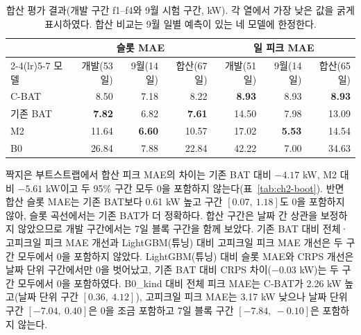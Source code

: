 \begin{table}[htbp]
\centering
\hwptablefont
\caption{합산 평가 결과(개발 구간 f1--f4와 9월 시험 구간, kW). 각 열에서 가장 낮은 값을 굵게 표시하였다. 합산 비교는 9월 일별 예측이 있는 네 모델에 한정한다.}\label{tab:ch2-pooled}
\begin{tabular}{lrrrrrr}
\toprule
& \multicolumn{3}{c}{슬롯 MAE} & \multicolumn{3}{c}{일 피크 MAE} \\
\cmidrule(lr){2-4}\cmidrule(lr){5-7}
모델 & 개발(53일) & 9월(14일) & 합산(67일) & 개발(51일) & 9월(14일) & 합산(65일) \\
\midrule
C-BAT & 8.50 & 7.18 & 8.22 & \textbf{8.93} & 8.93 & \textbf{8.93} \\
기존 BAT & \textbf{7.82} & 6.82 & \textbf{7.61} & 14.50 & 7.98 & 13.09 \\
M2 & 11.64 & \textbf{6.60} & 10.57 & 17.02 & \textbf{5.53} & 14.54 \\
B0 & 26.84 & 7.88 & 22.84 & 42.22 & 7.00 & 34.63 \\
\bottomrule
\end{tabular}
\end{table}

짝지은 부트스트랩에서 합산 피크 MAE의 차이는 기존 BAT 대비 $-4.17$ kW, M2 대비 $-5.61$ kW이고 두 95\% 구간 모두 0을 포함하지 않는다(표~\ref{tab:ch2-boot}). 반면 합산 슬롯 MAE는 기존 BAT보다 0.61 kW 높고 구간 $[0.07,\ 1.18]$도 0을 포함하지 않아, 슬롯 곡선에서는 기존 BAT가 더 정확하다. 합산 구간은 날짜 간 상관을 보정하지 않았으므로 개발 구간에서는 7일 블록 구간을 함께 보았다. 기존 BAT 대비 전체·고피크일 피크 MAE 개선과 LightGBM(튜닝) 대비 고피크일 피크 MAE 개선은 두 구간 모두에서 0을 포함하지 않았다. LightGBM(튜닝) 대비 슬롯 MAE와 CRPS 개선은 날짜 단위 구간에서만 0을 벗어났고, 기존 BAT 대비 CRPS 차이($-0.03$ kW)는 두 구간 모두에서 0을 포함하였다. B0\_kind 대비 전체 피크 MAE는 C-BAT가 2.26 kW 높고(날짜 단위 구간 $[0.36,\ 4.12]$), 고피크일 피크 MAE는 3.17 kW 낮으나 날짜 단위 구간 $[-7.04,\ 0.40]$은 0을 조금 포함하고 7일 블록 구간 $[-7.84,\ -0.10]$은 포함하지 않는다.

